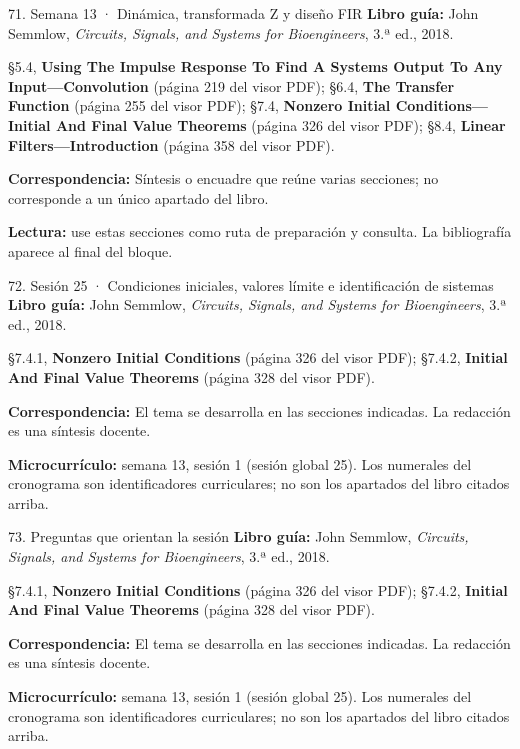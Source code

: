 \documentclass[
  10pt,
  ignorenonframetext,
  aspectratio=169,
  spanish,
]{beamer}
\begin{document}
\begin{frame}{71. Semana 13 · Dinámica, transformada Z y diseño FIR}
\label{semana-13-dinuxe1mica-transformada-z-y-diseuxf1o-fir}
\textbf{Libro guía:} John Semmlow, \emph{Circuits, Signals, and Systems
for Bioengineers}, 3.ª ed., 2018.

§5.4, \textbf{Using The Impulse Response To Find A Systems Output To Any
Input---Convolution} (página 219 del visor PDF); §6.4, \textbf{The
Transfer Function} (página 255 del visor PDF); §7.4, \textbf{Nonzero
Initial Conditions---Initial And Final Value Theorems} (página 326 del
visor PDF); §8.4, \textbf{Linear Filters---Introduction} (página 358 del
visor PDF).

\textbf{Correspondencia:} Síntesis o encuadre que reúne varias
secciones; no corresponde a un único apartado del libro.

\textbf{Lectura:} use estas secciones como ruta de preparación y
consulta. La bibliografía aparece al final del bloque.
\end{frame}

\begin{frame}{72. Sesión 25 · Condiciones iniciales, valores límite e
identificación de sistemas}
\label{sesiuxf3n-25-condiciones-iniciales-valores-luxedmite-e-identificaciuxf3n-de-sistemas}
\textbf{Libro guía:} John Semmlow, \emph{Circuits, Signals, and Systems
for Bioengineers}, 3.ª ed., 2018.

§7.4.1, \textbf{Nonzero Initial Conditions} (página 326 del visor PDF);
§7.4.2, \textbf{Initial And Final Value Theorems} (página 328 del visor
PDF).

\textbf{Correspondencia:} El tema se desarrolla en las secciones
indicadas. La redacción es una síntesis docente.

\textbf{Microcurrículo:} semana 13, sesión 1 (sesión global 25). Los
numerales del cronograma son identificadores curriculares; no son los
apartados del libro citados arriba.
\end{frame}

\begin{frame}{73. Preguntas que orientan la sesión}
\label{preguntas-que-orientan-la-sesiuxf3n-4}
\textbf{Libro guía:} John Semmlow, \emph{Circuits, Signals, and Systems
for Bioengineers}, 3.ª ed., 2018.

§7.4.1, \textbf{Nonzero Initial Conditions} (página 326 del visor PDF);
§7.4.2, \textbf{Initial And Final Value Theorems} (página 328 del visor
PDF).

\textbf{Correspondencia:} El tema se desarrolla en las secciones
indicadas. La redacción es una síntesis docente.

\textbf{Microcurrículo:} semana 13, sesión 1 (sesión global 25). Los
numerales del cronograma son identificadores curriculares; no son los
apartados del libro citados arriba.
\end{frame}
\end{document}
